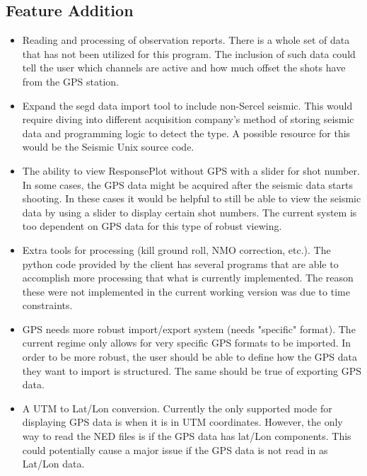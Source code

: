 \documentclass[12pt]{article}
\begin{document}
\subsection{Feature Addition}

\begin{itemize}

\item Reading and processing of observation reports. There is a whole set of data that has not been utilized for this program. The inclusion of such data could tell the user which channels are active and how much offset the shots have from the GPS station.

\item Expand the segd data import tool to include non-Sercel seismic. This would require diving into different acquisition company's method of storing seismic data and programming logic to detect the type. A possible resource for this would be the Seismic Unix source code.

\item The ability to view ResponsePlot without GPS with a slider for shot number. In some cases, the GPS data might be acquired after the seismic data starts shooting. In these cases it would be helpful to still be able to view the seismic data by using a slider to display certain shot numbers. The current system is too dependent on GPS data for this type of robust viewing.

\item Extra tools for processing (kill ground roll, NMO correction, etc.). The python code provided by the client has several programs that are able to accomplish more processing that what is currently implemented. The reason these were not implemented in the current working version was due to time constraints.

\item GPS needs more robust import/export system (needs "specific" format). The current regime only allows for very specific GPS formats to be imported. In order to be more robust, the user should be able to define how the GPS data they want to import is structured. The same should be true of exporting GPS data.

\item A UTM to Lat/Lon conversion. Currently the only supported mode for displaying GPS data is when it is in UTM coordinates. However, the only way to read the NED files is if the GPS data has lat/Lon components. This could potentially cause a major issue if the GPS data is not read in as Lat/Lon data. 


\end{itemize}
\end{document}
